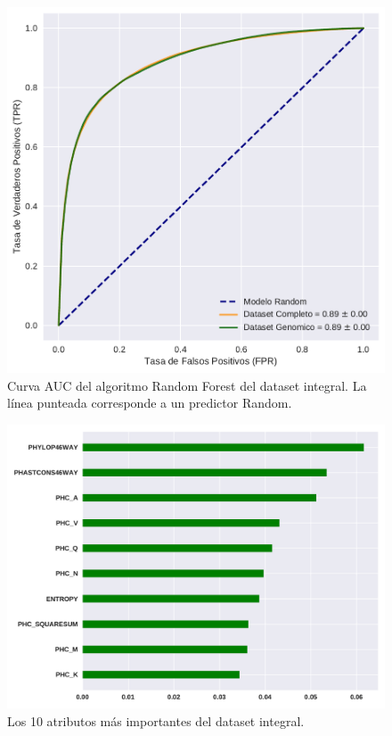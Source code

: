 \begin{figure}[H]
    \centering
    \includegraphics[scale=0.55]{documents/latex/figures/3/auc_3.pdf}
    \caption{Curva AUC del algoritmo Random Forest del dataset integral. La línea punteada corresponde a un predictor Random.}
    \label{fig:auc_3}
\end{figure}

\begin{figure}[H]
    \centering
    \includegraphics[scale=0.55]{documents/latex/figures/3/importance_3.pdf}
    \caption{Los 10 atributos más importantes del dataset integral.}
    \label{fig:importance_3}
\end{figure}

